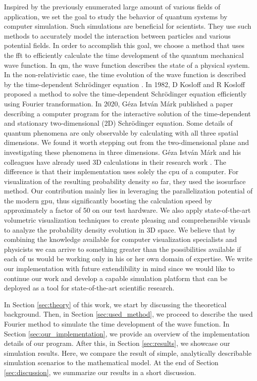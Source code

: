 Inspired by the previously enumerated large amount of various fields of application, we set the goal to study the behavior of quantum systems by computer simulation.
Such simulations are beneficial for scientists. They use such methods to accurately model the interaction between particles and various potential fields.
In order to accomplish this goal, we choose a method that uses the \acrfull{fft} to efficiently calculate the time development of the quantum mechanical wave function.
In \acrshort{qm}, the wave function describes the state of a physical system. In the non-relativistic case, the time evolution of the wave function is described by the time-dependent Schrödinger equation \cite{schrodinger1926}.
In 1982, D Kosloff and R Kosloff proposed a method \cite{KOSLOFF198335} to solve the time-dependent Schrödinger equation efficiently using Fourier transformation.
In 2020, Géza István Márk published a paper \cite{mark2020webschrodinger} describing a computer program for the interactive solution of the time-dependent and stationary two-dimensional (2D) Schrödinger equation.
Some details of quantum phenomena are only observable by calculating with all three spatial dimensions.
We found it worth stepping out from the two-dimensional plane and investigating these phenomena in three dimensions.
Géza István Márk and his colleagues have already used 3D calculations in their research work \cite{VANCSO2013101, Mark2016}.
The difference is that their implementation uses solely the \acrfull{cpu} of a computer.
For visualization of the resulting probability density so far, they used the isosurface method.
Our contribution mainly lies in leveraging the parallelization potential of the modern \acrfull{gpu}, thus significantly boosting the calculation speed by approximately a factor of 50 on our test hardware.
We also apply state-of-the-art volumetric visualization techniques to create pleasing and comprehensible visuals to analyze the probability density evolution in 3D space.
We believe that by combining the knowledge available for computer visualization specialists and physicists we can arrive to something greater than the possibilities available if each of us would be working only in his or her own domain of expertise.
We write our implementation with future extendibility in mind since we would like to continue our work and develop a capable simulation platform that can be deployed as a tool for state-of-the-art scientific research.

In Section \ref{sec:theory} of this work, we start by discussing the theoretical background.
Then, in Section \ref{sec:used_method}, we proceed to describe the used Fourier method to simulate the time development of the wave function.
In Section \ref{sec:our_implementation}, we provide an overview of the implementation details of our program.
After this, in Section \ref{sec:results}, we showcase our simulation results.
Here, we compare the result of simple, analytically describable simulation scenarios to the mathematical model.
At the end of Section \ref{sec:discussion}, we summarize our results in a short discussion.



